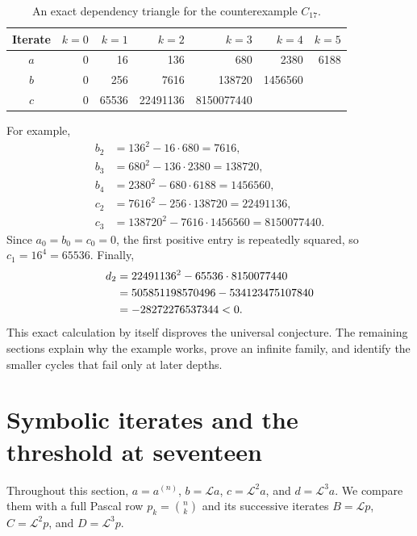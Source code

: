 \documentclass[11pt,a4paper]{article}
\theoremstyle{definition}
\newcommand{\Lop}{\mathcal L}
\newcommand{\aco}{a^{(n)}}
\newcommand{\bin}[2]{\binom{#1}{#2}}
\begin{document}
\begin{table}[htbp]
\centering
\small
\begin{tabular}{@{}crrrrrr@{}}
\toprule
Iterate & $k=0$ & $k=1$ & $k=2$ & $k=3$ & $k=4$ & $k=5$\\
\midrule
$a$ & 0 & 16 & 136 & 680 & 2380 & 6188\\
$b$ & 0 & 256 & 7616 & 138720 & 1456560 & \\
$c$ & 0 & 65536 & 22491136 & 8150077440 & & \\
\bottomrule
\end{tabular}
\caption{An exact dependency triangle for the counterexample $C_{17}$.}
\label{tab:triangle}
\end{table}

For example,
\begin{align*}
 b_2&=136^2-16\cdot680=7616,\\
 b_3&=680^2-136\cdot2380=138720,\\
 b_4&=2380^2-680\cdot6188=1456560,\\
 c_2&=7616^2-256\cdot138720=22491136,\\
 c_3&=138720^2-7616\cdot1456560=8150077440.
\end{align*}
Since $a_0=b_0=c_0=0$, the first positive entry is repeatedly squared,
so $c_1=16^4=65536$. Finally,
\begin{align}
 d_2
  &=22491136^2-65536\cdot8150077440\notag\\
  &=505851198570496-534123475107840\notag\\
  &=-28272276537344<0.\label{eq:C17}
\end{align}
This exact calculation by itself disproves the universal conjecture. The
remaining sections explain why the example works, prove an infinite
family, and identify the smaller cycles that fail only at later depths.

\section{Symbolic iterates and the threshold at seventeen}\label{sec:symbolic}

Throughout this section, $a=\aco$, $b=\Lop a$, $c=\Lop^2a$, and
$d=\Lop^3a$. We compare them with a full Pascal row
$p_k=\bin nk$ and its successive iterates
$B=\Lop p$, $C=\Lop^2p$, and $D=\Lop^3p$.
\end{document}
